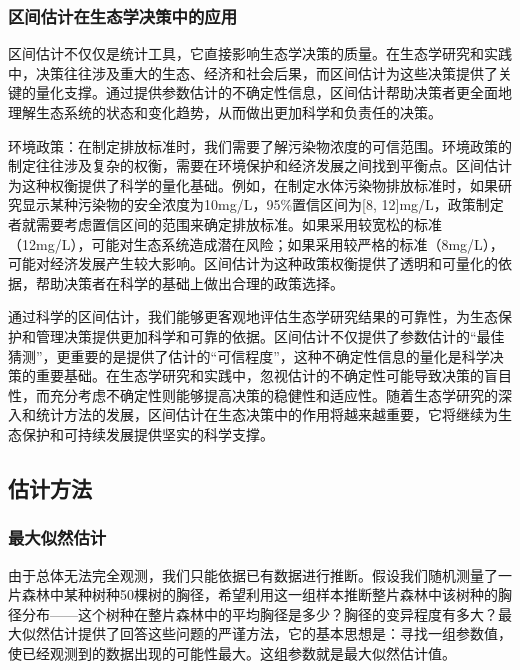 \documentclass[
  twoside,12pt,fontset=none]{ctexbook}
\begin{document}
\hypertarget{ux533aux95f4ux4f30ux8ba1ux5728ux751fux6001ux5b66ux51b3ux7b56ux4e2dux7684ux5e94ux7528}{%
\subsubsection{区间估计在生态学决策中的应用}\label{ux533aux95f4ux4f30ux8ba1ux5728ux751fux6001ux5b66ux51b3ux7b56ux4e2dux7684ux5e94ux7528}}

区间估计不仅仅是统计工具，它直接影响生态学决策的质量。在生态学研究和实践中，决策往往涉及重大的生态、经济和社会后果，而区间估计为这些决策提供了关键的量化支撑。通过提供参数估计的不确定性信息，区间估计帮助决策者更全面地理解生态系统的状态和变化趋势，从而做出更加科学和负责任的决策。

环境政策：在制定排放标准时，我们需要了解污染物浓度的可信范围。环境政策的制定往往涉及复杂的权衡，需要在环境保护和经济发展之间找到平衡点。区间估计为这种权衡提供了科学的量化基础。例如，在制定水体污染物排放标准时，如果研究显示某种污染物的安全浓度为10mg/L，95\%置信区间为{[}8, 12{]}mg/L，政策制定者就需要考虑置信区间的范围来确定排放标准。如果采用较宽松的标准（12mg/L），可能对生态系统造成潜在风险；如果采用较严格的标准（8mg/L），可能对经济发展产生较大影响。区间估计为这种政策权衡提供了透明和可量化的依据，帮助决策者在科学的基础上做出合理的政策选择。

通过科学的区间估计，我们能够更客观地评估生态学研究结果的可靠性，为生态保护和管理决策提供更加科学和可靠的依据。区间估计不仅提供了参数估计的``最佳猜测''，更重要的是提供了估计的``可信程度''，这种不确定性信息的量化是科学决策的重要基础。在生态学研究和实践中，忽视估计的不确定性可能导致决策的盲目性，而充分考虑不确定性则能够提高决策的稳健性和适应性。随着生态学研究的深入和统计方法的发展，区间估计在生态决策中的作用将越来越重要，它将继续为生态保护和可持续发展提供坚实的科学支撑。

\hypertarget{ux4f30ux8ba1ux65b9ux6cd5}{%
\subsection{估计方法}\label{ux4f30ux8ba1ux65b9ux6cd5}}

\hypertarget{ux6700ux5927ux4f3cux7136ux4f30ux8ba1}{%
\subsubsection{最大似然估计}\label{ux6700ux5927ux4f3cux7136ux4f30ux8ba1}}

由于总体无法完全观测，我们只能依据已有数据进行推断。假设我们随机测量了一片森林中某种树种50棵树的胸径，希望利用这一组样本推断整片森林中该树种的胸径分布------这个树种在整片森林中的平均胸径是多少？胸径的变异程度有多大？最大似然估计提供了回答这些问题的严谨方法，它的基本思想是：寻找一组参数值，使已经观测到的数据出现的可能性最大。这组参数就是最大似然估计值。
\end{document}
